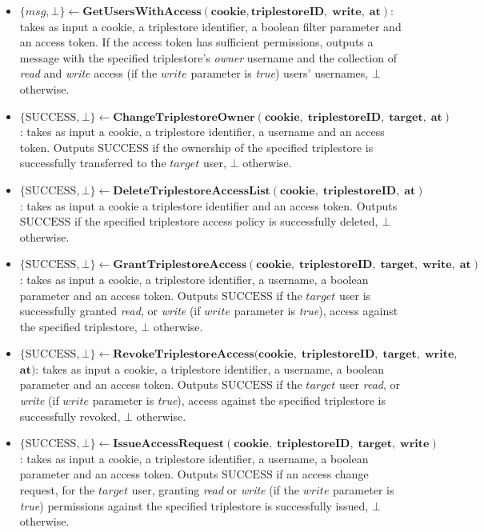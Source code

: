 \begin{definition}
\begin{itemize}
        \item $\{msg, \bot\} \leftarrow \mathbf{GetUsersWithAccess(cookie, triplestoreID, \; write, \; at)}$: takes as input a cookie, a triplestore identifier, a boolean filter parameter and an access token. If the access token has sufficient permissions, outputs a message with the specified triplestore's \emph{owner} username and the collection of \emph{read} and \emph{write} access (if the $write$ parameter is \emph{true}) users' usernames, $\bot$ otherwise.

        \item $\{\textrm{SUCCESS}, \bot\} \leftarrow \mathbf{ChangeTriplestoreOwner(cookie, \; triplestoreID, \; target, \; at)}$: \linebreak takes as input a cookie, a triplestore identifier, a username and an access token. Outputs $\textrm{SUCCESS}$ if the ownership of the specified triplestore is successfully transferred to the $target$ user, $\bot$ otherwise.

        \item $\{\textrm{SUCCESS}, \bot\} \leftarrow \mathbf{DeleteTriplestoreAccessList(cookie, \; triplestoreID, \; at)}$: takes as input a cookie a triplestore identifier and an access token. Outputs $\textrm{SUCCESS}$ if the specified triplestore access policy is successfully deleted, $\bot$ otherwise.

        \item $\{\textrm{SUCCESS}, \bot\} \leftarrow \mathbf{GrantTriplestoreAccess(cookie, \; triplestoreID, \; target,\; write, \; at)}$: takes as input a cookie, a triplestore identifier, a username, a boolean parameter and an access token. Outputs $\textrm{SUCCESS}$ if the $target$ user is successfully granted \emph{read}, or \emph{write} (if $write$ parameter is \emph{true}), access against the specified triplestore, $\bot$ otherwise.

        \item $\{\textrm{SUCCESS}, \bot\} \leftarrow \mathbf{RevokeTriplestoreAccess(cookie, \; triplestoreID, \; target,\; write, }$\linebreak$\mathbf{ at)}$: takes as input a cookie, a triplestore identifier, a username, a boolean parameter and an access token. Outputs $\textrm{SUCCESS}$ if the $target$ user \emph{read}, or \emph{write} (if $write$ parameter is \emph{true}), access against the specified triplestore is successfully revoked, $\bot$ otherwise.

        \item $\{\textrm{SUCCESS}, \bot\} \leftarrow \mathbf{IssueAccessRequest(cookie, \; triplestoreID, \; target,\; write)}$: takes as input a cookie, a triplestore identifier, a username, a boolean parameter and an access token. Outputs $\textrm{SUCCESS}$ if an access change request, for the $target$ user, granting \emph{read} or \emph{write} (if the $write$ parameter is \emph{true}) permissions against the specified triplestore is successfully issued, $\bot$ otherwise.


\end{itemize}
\end{definition}
